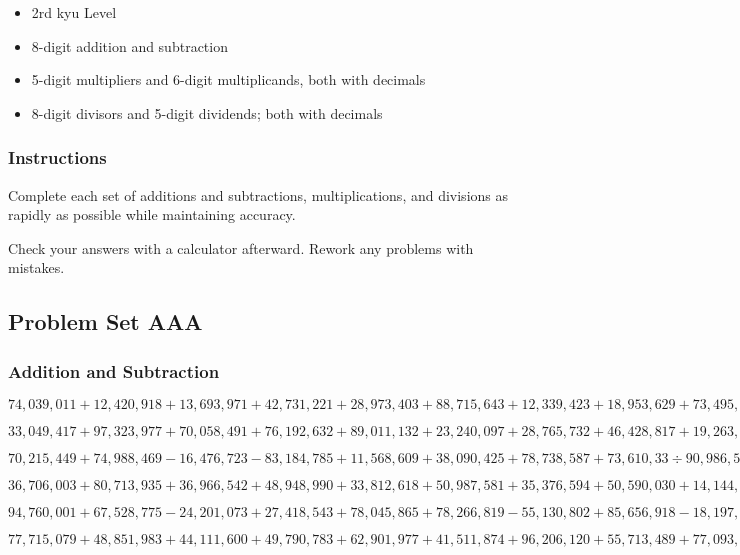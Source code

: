 \begin{itemize}
\item
  2rd kyu Level
\item
  8-digit addition and subtraction
\item
  5-digit multipliers and 6-digit multiplicands, both with decimals
\item
  8-digit divisors and 5-digit dividends; both with decimals
\end{itemize}

\hypertarget{instructions-6}{%
\subsubsection{Instructions}\label{instructions-6}}

Complete each set of additions and subtractions, multiplications, and
divisions as rapidly as possible while maintaining accuracy.

Check your answers with a calculator afterward. Rework any problems with
mistakes.

\hypertarget{problem-set-aaa}{%
\subsection{Problem Set AAA}\label{problem-set-aaa}}

\hypertarget{addition-and-subtraction-356}{%
\subsubsection{Addition and
Subtraction}\label{addition-and-subtraction-356}}

\(74,039,011+12,420,918+13,693,971+42,731,221+28,973,403+88,715,643+12,339,423+18,953,629+73,495,890+59,712,837\)

\(33,049,417+97,323,977+70,058,491+76,192,632+89,011,132+23,240,097+28,765,732+46,428,817+19,263,626+88,692,626\)

\(70,215,449+74,988,469-16,476,723-83,184,785+11,568,609+38,090,425+78,738,587+73,610,33÷90,986,531-36,801,427\)

\(36,706,003+80,713,935+36,966,542+48,948,990+33,812,618+50,987,581+35,376,594+50,590,030+14,144,665+42,284,058\)

\(94,760,001+67,528,775-24,201,073+27,418,543+78,045,865+78,266,819-55,130,802+85,656,918-18,197,688-77,006,918\)

\(77,715,079+48,851,983+44,111,600+49,790,783+62,901,977+41,511,874+96,206,120+55,713,489+77,093,325+59,721,806\)

